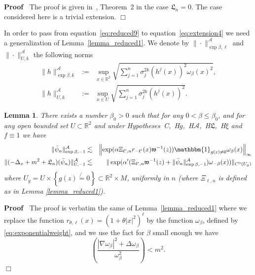 \documentclass[a4paper,10pt]{article}
\newcommand{\assign}{:=}
\newenvironment{proof}{\noindent\textbf{Proof\ }}{\hspace*{\fill}$\Box$\medskip}
\newtheorem{lemma}[theorem]{Lemma}
\begin{document}
\begin{proof}
  The proof is given in~{\cite{Albeverio2018elliptic}}, Theorem~2 in the case
  $\mathfrak{L}_n = 0$. The case considered here is a trivial extension. 
\end{proof}

In order to pass from equation~{\eqref{eq:reduced9}} to
equation~{\eqref{eq:extension4}} we need a generalization of
Lemma~\ref{lemma_reduced1}. We denote by $\| \cdot \|_{\exp \beta,
\ell}^{\mathcal{A}}$ and $\| \cdot \|^{\mathcal{A}}_{U, k}$ the following
norms
\[ \begin{array}{lll}
     \| h \|^{\mathcal{A}}_{\exp \beta, k} & \assign & \sup_{x \in
     \mathbb{R}^2} \sqrt{\sum_{j = 1}^n \sigma_j^{2 k} (h^j (x))^2
     \omega_{\beta} (x)^2},\\
     \| h \|^{\mathcal{A}}_{U, k} & \assign & \sup_{x \in U} \sqrt{\sum_{j =
     1}^n \sigma_j^{2 k} (h^j (x))^2} .
   \end{array} \]


\begin{lemma}
  \label{lemma_extension2}There exists a number $\beta_0 > 0$ such that for
  any $0 < \beta \leqslant \beta_0$, and for any open bounded set $U \subset
  \mathbb{R}^2$ and under
  Hypotheses~C,~H$g$,~H$\mathcal{A}$,~H$\mathfrak{L}$,~H$\xi$ and $f \equiv 1$
  we have
  \begin{eqnarray}
    \| \bar{\psi}_n \|^{\mathcal{A}}_{\exp \beta, - 1} & \lesssim & \left\|
    \exp (\alpha \Xi_{\ell', n} r_{- \ell'} (x) \mathfrak{w}^{- 1} (z))
    \mathbbm{1}_{g (z) \not{=} 0} \omega_{\beta} (x) \right\|_{\infty}
    \label{eq:extension5} \\
    \| (- \Delta_x + m^2 + \mathfrak{L}_n) (\bar{\psi}_n) \|^{\mathcal{A}}_{U,
    - 1} & \lesssim & \| \exp (\alpha' (\Xi_{\ell', n} \mathfrak{w}^{- 1} (z)
    + \| \bar{\psi}_n \|^{\mathcal{A}}_{\exp \beta, - 1}) \omega_{- \beta}
    (x)) \|_{C^0 (U_g)} \label{eq:extension6} 
  \end{eqnarray}
  where $U_g = U \times \left\{ g (z) \not{=} 0 \right\} \subset \mathbb{R}^2
  \times M$, uniformly in $n$ (where $\Xi_{\ell, n}$ is defined as in Lemma
  \ref{lemma_reduced1}).
\end{lemma}

\begin{proof}
  The proof is verbatim the same of Lemma~\ref{lemma_reduced1} where we
  replace the function $r_{\theta, \ell} (x) = (1 + \theta | x |^2)^{\ell}$ by
  the function $\omega_{\beta}$, defined by {\eqref{eq:exponentialweight}},
  and we use the fact for $\beta$ small enough we have
  \[ \left( \frac{| \nabla \omega_{\beta} |^2 + \Delta
     \omega_{\beta}}{\omega_{\beta}^2} \right) < m^2 . \]
\end{proof}
\end{document}
